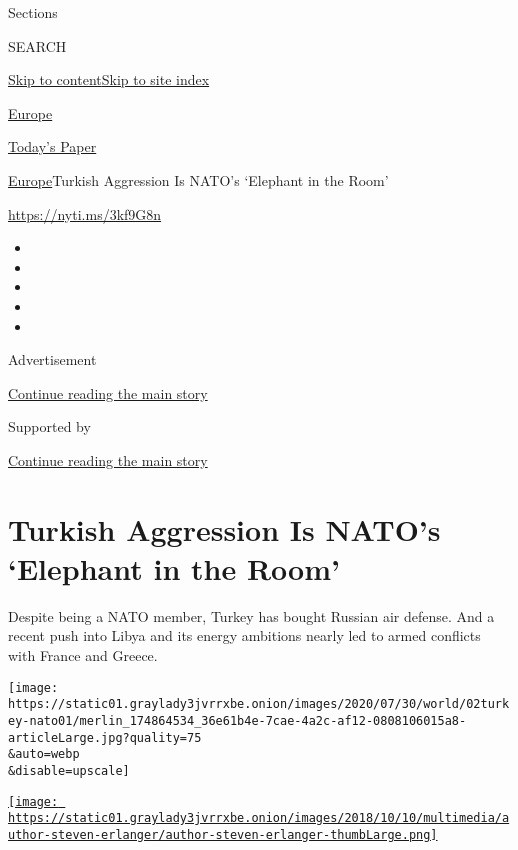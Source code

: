 Sections

SEARCH

\protect\hyperlink{site-content}{Skip to
content}\protect\hyperlink{site-index}{Skip to site index}

\href{https://www.nytimes3xbfgragh.onion/section/world/europe}{Europe}

\href{https://myaccount.nytimes3xbfgragh.onion/auth/login?response_type=cookie\&client_id=vi}{}

\href{https://www.nytimes3xbfgragh.onion/section/todayspaper}{Today's
Paper}

\href{/section/world/europe}{Europe}\textbar{}Turkish Aggression Is
NATO's `Elephant in the Room'

\url{https://nyti.ms/3kf9G8n}

\begin{itemize}
\item
\item
\item
\item
\item
\end{itemize}

Advertisement

\protect\hyperlink{after-top}{Continue reading the main story}

Supported by

\protect\hyperlink{after-sponsor}{Continue reading the main story}

\hypertarget{turkish-aggression-is-natos-elephant-in-the-room}{%
\section{Turkish Aggression Is NATO's `Elephant in the
Room'}\label{turkish-aggression-is-natos-elephant-in-the-room}}

Despite being a NATO member, Turkey has bought Russian air defense. And
a recent push into Libya and its energy ambitions nearly led to armed
conflicts with France and Greece.

\texttt{[image: https://static01.graylady3jvrrxbe.onion/images/2020/07/30/world/02turkey-nato01/merlin\_174864534\_36e61b4e-7cae-4a2c-af12-0808106015a8-articleLarge.jpg?quality=75\\\&auto=webp\\\&disable=upscale]}

\href{https://www.nytimes3xbfgragh.onion/by/steven-erlanger}{\texttt{[image: https://static01.graylady3jvrrxbe.onion/images/2018/10/10/multimedia/author-steven-erlanger/author-steven-erlanger-thumbLarge.png]}}

